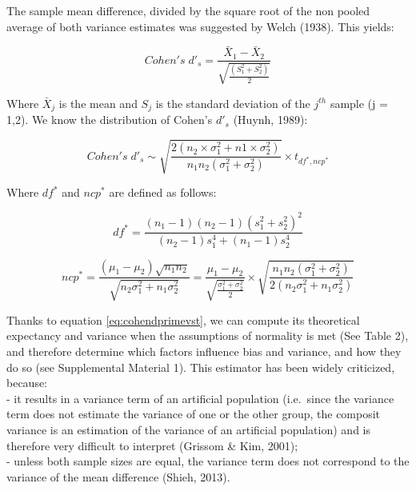 \documentclass[
  man,floatsintext]{apa6}
\begin{document}
The sample mean difference, divided by the square root of the non pooled average of both variance estimates was suggested by Welch (1938). This yields:

\begin{equation} 
Cohen's \; d'_s = \frac{\bar{X}_{1} - \bar{X}_{2}}{ \sqrt{\frac{\left(S^2_{1}+S^2_{2} \right)}{2}}}
\label{eq:cohenprimeds}
\end{equation}

Where \(\bar{X}_{j}\) is the mean and \(S_j\) is the standard deviation of the \(j^{th}\) sample (j = 1,2). We know the distribution of Cohen's \(d'_{s}\) (Huynh, 1989):

\begin{equation} 
Cohen's \; d'_s \sim  \sqrt{\frac{2(n_2\times\sigma^2_1+n1\times\sigma^2_2)}{n_1n_2(\sigma^2_1+\sigma^2_2)}} \times t_{df^*,ncp^*}
\label{eq:cohendprimedist}
\end{equation}

Where \(df^*\) and \(ncp^*\) are defined as follows:

\begin{equation} 
df^* = \frac{(n_1-1)(n_2-1)(s^2_1+s^2_2)^2}{(n_2-1)s^4_1+(n_1-1)s^4_2}
\label{eq:cohendprimedf}
\end{equation}

\begin{equation} 
ncp^*=\frac{(\mu_1-\mu_2)\sqrt{n_1n_2}}{\sqrt{n_2\sigma^2_1+n_1\sigma^2_2}}=\frac{\mu_1-\mu_2}{\sqrt{\frac{\sigma^2_1+\sigma^2_2}{2}}} \times \sqrt{\frac{n_1n_2(\sigma^2_1+\sigma^2_2)}{2(n_2\sigma^2_1+n_1\sigma^2_2)}}
\label{eq:cohendprimevst}
\end{equation}

Thanks to equation \ref{eq:cohendprimevst}, we can compute its theoretical expectancy and variance when the assumptions of normality is met (See Table 2), and therefore determine which factors influence bias and variance, and how they do so (see Supplemental Material 1). This estimator has been widely criticized, because:\\
- it results in a variance term of an artificial population (i.e.~since the variance term does not estimate the variance of one or the other group, the composit variance is an estimation of the variance of an artificial population) and is therefore very difficult to interpret (Grissom \& Kim, 2001);\\
- unless both sample sizes are equal, the variance term does not correspond to the variance of the mean difference (Shieh, 2013).
\end{document}
